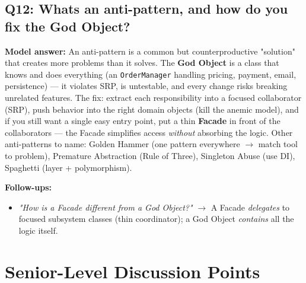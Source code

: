 \documentclass[11pt]{article}
\providecommand{\tightlist}{\setlength{\itemsep}{1pt}\setlength{\parskip}{0pt}}
\begin{document}
\subsection{Q12: What\textquotesingle s an anti-pattern, and how do you fix the God Object?}\label{q12-whats-an-anti-pattern-and-how-do-you-fix-the-god-object}

\textbf{Model answer:} An anti-pattern is a common but counterproductive "solution" that creates more problems than it solves. The \textbf{God Object} is a class that knows and does everything (an \texttt{OrderManager} handling pricing, payment, email, persistence) --- it violates SRP, is untestable, and every change risks breaking unrelated features. The fix: extract each responsibility into a focused collaborator (SRP), push behavior into the right domain objects (kill the anemic model), and if you still want a single easy entry point, put a thin \textbf{Facade} in front of the collaborators --- the Facade simplifies access \emph{without} absorbing the logic. Other anti-patterns to name: Golden Hammer (one pattern everywhere \(\rightarrow\) match tool to problem), Premature Abstraction (Rule of Three), Singleton Abuse (use DI), Spaghetti (layer + polymorphism).

\textbf{Follow-ups:}

\begin{itemize}
\tightlist
\item
  \emph{"How is a Facade different from a God Object?"} \(\rightarrow\) A Facade \emph{delegates} to focused subsystem classes (thin coordinator); a God Object \emph{contains} all the logic itself.
\end{itemize}

\section{Senior-Level Discussion Points}\label{senior-level-discussion-points}
\end{document}
